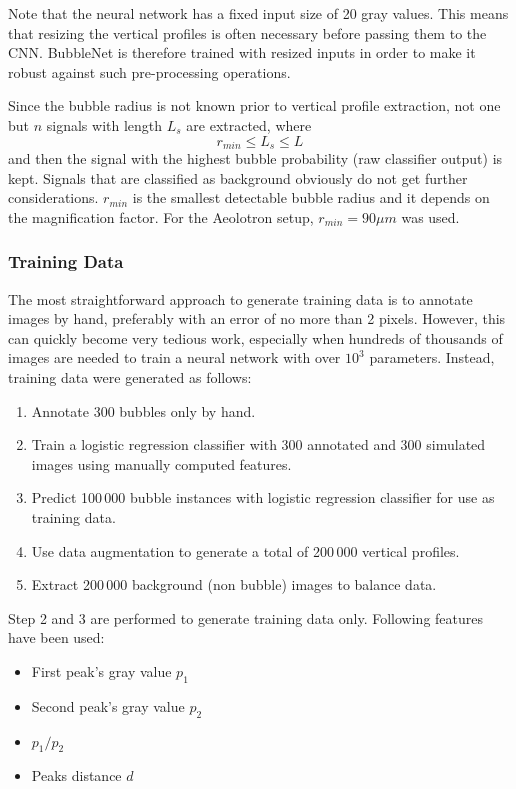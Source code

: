 	Note that the neural network has a fixed input size of 20 gray values. This means that resizing the vertical profiles is often necessary before passing them to the CNN. BubbleNet is therefore trained with resized inputs in order to make it robust against such pre-processing operations. 
	
	Since the bubble radius is not known prior to vertical profile extraction, not one but $n$ signals with length $L_s$ are extracted, where 
	\begin{equation}
		r_{min} \leq L_s \leq L
	\end{equation}
	and then the signal with the highest bubble probability (raw classifier output) is kept. Signals that are classified as background obviously do not get further considerations. $r_{min}$ is the smallest detectable bubble radius and it depends on the magnification factor. For the Aeolotron setup, $r_{min} = 90 \mu m$ was used.

		\subsubsection{Training Data}
			The most straightforward approach to generate training data is to annotate images by hand, preferably with an error of no more than 2 pixels. However, this can quickly become very tedious work, especially when hundreds of thousands of images are needed to train a neural network with over $10^{3}$ parameters. Instead, training data were generated as follows:
			\begin{enumerate}
				\item Annotate 300 bubbles only by hand.
				\item Train a logistic regression classifier with 300 annotated and 300 simulated images using manually computed features.
				\item Predict 100\,000 bubble instances with logistic regression classifier for use as training data. 
				\item Use data augmentation to generate a total of 200\,000 vertical profiles. 				
				\item Extract 200\,000 background (non bubble) images to balance data.
			\end{enumerate}
			
			Step 2 and 3 are performed to generate training data only. Following features have been used:
			\begin{itemize}
				\item First peak's gray value $p_1$
				\item Second peak's gray value $p_2$
				\item $p_1/p_2$
				\item Peaks distance $d$
			\end{itemize}
			
